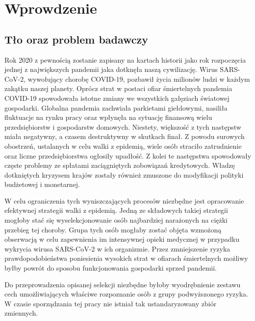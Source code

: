 \documentclass[polish, twoside, 12pt, a4paper]{article}
\theoremstyle{definition}
\theoremstyle{plain}
\theoremstyle{remark}
\begin{document}
\section{Wprowdzenie}


\subsection{Tło oraz problem badawczy}

Rok 2020 z pewnością zostanie zapisany na kartach historii jako rok rozpoczęcia jednej z największych pandemii jaka dotknęła naszą cywilizację. Wirus SARS-CoV-2, wywołujący chorobę COVID-19, pozbawił życia milionów ludzi w każdym zakątku naszej planety. Oprócz strat w postaci ofiar śmiertelnych pandemia COVID-19 spowodowała istotne zmiany we wszystkich gałęziach światowej gospodarki. Globalna pandemia zachwiała parkietami giełdowymi, nasiliła fluktuacje na rynku pracy oraz wpłynęła na sytuację finansową wielu przedsiębiorstw i gospodarstw domowych. Niestety, większość z tych następstw miała negatywny, a czasem destruktywny w skutkach finał. Z powodu surowych obostrzeń, ustalanych w celu walki z epidemią, wiele osób straciło zatrudnienie oraz liczne przedsiębiorstwa ogłosiły upadłość. Z kolei te następstwa spowodowały częste problemy ze spłatami zaciągniętych zobowiązań kredytowych. Władzę dotkniętych kryzysem krajów zostały również zmuszone do modyfikacji polityki budżetowej i monetarnej.  

W celu ograniczenia tych wyniszczających procesów niezbędne jest opracowanie efektywnej strategii walki z epidemią. Jedną ze składowych takiej strategii mogłoby stać się wyselekcjonowanie osób najbardziej narażonych na ciężki przebieg tej choroby. Grupa tych osób mogłaby zostać objęta wzmożoną obserwacją w celu zapewnienia im intensywnej opieki medycznej w przypadku wykrycia wirusa SARS-CoV-2 w ich organizmie. Przez zmniejszenie ryzyka prawdopodobieństwa poniesienia wysokich strat w ofiarach śmiertelnych możliwy byłby powrót do sposobu funkcjonowania gospodarki sprzed pandemii. 

Do przeprowadzenia opisanej selekcji niezbędne byłoby wyodrębnienie zestawu cech umożliwiających właściwe rozpoznanie osób z grupy podwyższonego ryzyka. W czasie sporządzania tej pracy nie istniał tak ustandaryzowany zbiór zmiennych.
\end{document}
